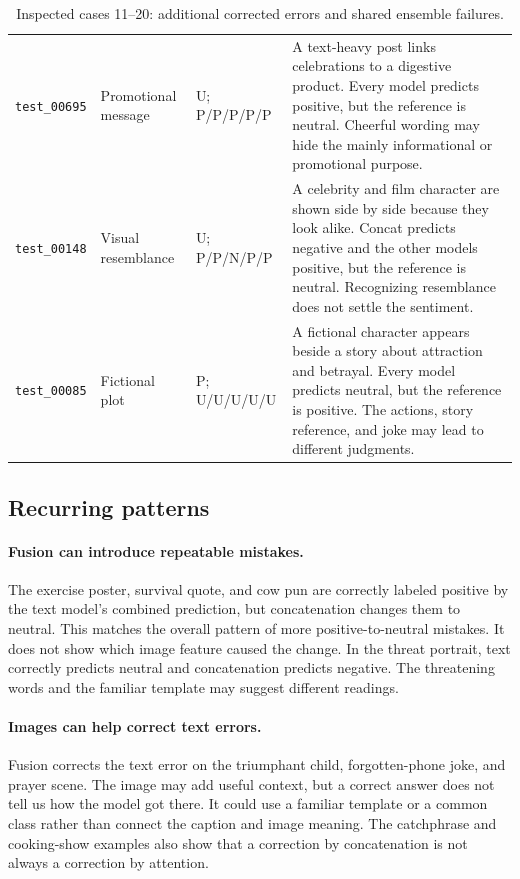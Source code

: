 \documentclass[11pt,a4paper]{article}
\begin{document}
\begin{table}[p]
\begin{tabular}{>{\raggedright\arraybackslash}p{1.95cm}>{\raggedright\arraybackslash}p{2.30cm}>{\raggedright\arraybackslash}p{2.1cm}>{\raggedright\arraybackslash}p{7.1cm}}
\texttt{test\_00695} & Promotional message & U; P/P/P/P/P & A text-heavy post links celebrations to a digestive product. Every model predicts positive, but the reference is neutral. Cheerful wording may hide the mainly informational or promotional purpose. \\[4pt]
\texttt{test\_00148} & Visual resemblance & U; P/P/N/P/P & A celebrity and film character are shown side by side because they look alike. Concat predicts negative and the other models positive, but the reference is neutral. Recognizing resemblance does not settle the sentiment. \\[4pt]
\texttt{test\_00085} & Fictional plot & P; U/U/U/U/U & A fictional character appears beside a story about attraction and betrayal. Every model predicts neutral, but the reference is positive. The actions, story reference, and joke may lead to different judgments. \\[4pt]
\bottomrule
\end{tabular}
\caption{Inspected cases 11--20: additional corrected errors and shared ensemble failures.}
\label{tab:cases-cont}
\end{table}
\clearpage

\normalsize
\setlength{\tabcolsep}{6pt}

\subsection{Recurring patterns}
\paragraph{Fusion can introduce repeatable mistakes.}
The exercise poster, survival quote, and cow pun are correctly labeled positive by the text model's combined prediction, but concatenation changes them to neutral. This matches the overall pattern of more positive-to-neutral mistakes. It does not show which image feature caused the change. In the threat portrait, text correctly predicts neutral and concatenation predicts negative. The threatening words and the familiar template may suggest different readings.

\paragraph{Images can help correct text errors.}
Fusion corrects the text error on the triumphant child, forgotten-phone joke, and prayer scene. The image may add useful context, but a correct answer does not tell us how the model got there. It could use a familiar template or a common class rather than connect the caption and image meaning. The catchphrase and cooking-show examples also show that a correction by concatenation is not always a correction by attention.
\end{document}
